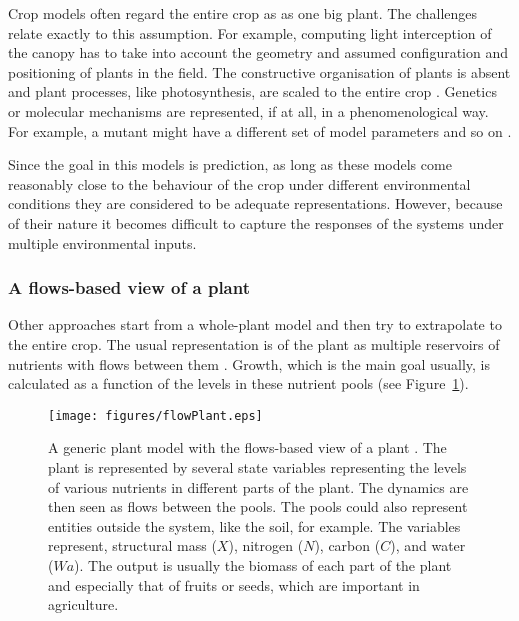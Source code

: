 Crop models often regard the entire crop as as one big plant. The challenges
relate exactly to this assumption. For example, computing light interception of
the canopy has to take into account the geometry and assumed configuration and
positioning of plants in the field. The constructive organisation of plants is
absent and plant processes, like photosynthesis, are scaled to the entire crop
\citep{monteith_light_1965}. Genetics or molecular mechanisms are represented,
if at all, in a phenomenological way. For example, a mutant might have a
different set of model parameters and so on \citep{parent_can_2014}.

Since the goal in this models is prediction, as long as these models come
reasonably close to the behaviour of the crop under different environmental
conditions they are considered to be adequate representations. However, because
of their nature it becomes difficult to capture the responses of the systems
under multiple environmental inputs.

\subsubsection*{A flows-based view of a plant}
Other approaches start from a whole-plant model and then try to extrapolate to
the entire crop. The usual representation is of the plant as multiple reservoirs
of nutrients with flows between them \citep{france_mathematical_1984}. Growth,
which is the main goal usually, is calculated as a function of the levels in
these nutrient pools (see Figure~\ref{fig:plantFlow}).

\begin{figure}[tb]
\centering  
\texttt{[image: figures/flowPlant.eps]}
\caption{A generic plant model with the flows-based view of a plant
  \citep{france_mathematical_1984}. The plant is represented by several state
  variables representing the levels of various nutrients in different parts of
  the plant. The dynamics are then seen as flows between the pools. The pools
  could also represent entities outside the system, like the soil, for
  example. The variables represent, structural mass ($X$), nitrogen ($N$),
  carbon ($C$), and water ($Wa$). The output is usually the biomass of each part
  of the plant and especially that of fruits or seeds, which are important in
  agriculture.}
  \label{fig:plantFlow}
\end{figure}


